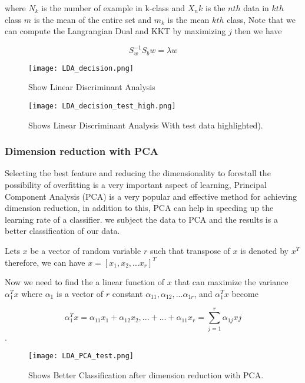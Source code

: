 \documentclass[a4paper, parskip=full]{scrartcl}
\begin{document}
where $N_k$ is the number of example in k-class and $X_nk$ is the $nth$ data in $kth$ class $m$ is the mean of the entire set and $m_k$ is the mean $kth$ class, Note that we can compute the Langrangian Dual and KKT by maximizing $j$ then we have

\[S_w^{-1}S_b w = \lambda w\]


\begin{figure}
	
	\centering
	\texttt{[image: LDA\_decision.png]}
	\caption{Show Linear Discriminant Analysis }
	
\end{figure}

\begin{figure}
	\centering
	\texttt{[image: LDA\_decision\_test\_high.png]}
	\caption{ Shows Linear Discriminant Analysis With test data highlighted).}
	
\end{figure}


 
 \subsubsection*{Dimension reduction with PCA}
 
 Selecting the best feature and reducing the dimensionality to forestall the possibility of overfitting is a very important aspect of learning, Principal Component Analysis (PCA) is a very popular and effective method for achieving dimension reduction, in addition to this, PCA can help in speeding up the learning rate of a classifier. we subject the data to PCA and the results is a better classification of our data.


 Lets $x$ be a vector of random variable $ r $ such that transpose of $x$ is denoted by $x^T$ therefore, we can have $ x = [x_1,x_2,...x_r]^T$
 
 Now we need to find the a linear function of $x$ that can maximize the variance $\alpha_1^Tx$ where $\alpha_1$ is a vector of $r$ constant $\alpha_{11}, \alpha_{12},...\alpha_{1r}$, and $\alpha_1^Tx$ become
 
 \[\alpha_1^Tx = \alpha_{11}x_1 + \alpha_{12}x_2,...+...+\alpha_{11}x_r = \sum_{j =1}^{r}\alpha_{1j}{xj}\].

\begin{figure}
	\centering
	\texttt{[image: LDA\_PCA\_test.png]}
	\caption{ Shows Better Classification after dimension reduction with PCA.}
	
\end{figure}
\end{document}
